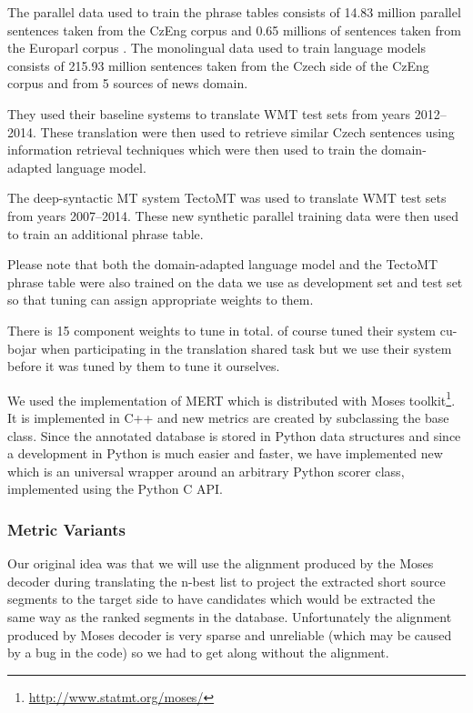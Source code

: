 The parallel data used to train the phrase tables consists of 14.83 million
parallel sentences taken from the CzEng corpus  and 0.65
millions of sentences taken from the Europarl corpus .
The monolingual data used to train language models consists of 215.93 million
sentences taken from the Czech side of the CzEng corpus and from 5 sources of
news domain. 

They used their baseline systems to translate WMT test sets from years
2012--2014.  These translation were then used to retrieve similar Czech
sentences using information retrieval techniques which were then used to train
the domain-adapted language model.

The deep-syntactic MT system TectoMT was used to translate WMT test sets from
years 2007--2014. These new synthetic parallel training data were then used to 
train an additional phrase table. 

Please note that both the domain-adapted language model and the TectoMT phrase
table were also trained on the data we use as development set and test set so
that tuning can assign appropriate weights to them.

There is 15 component weights to tune in total.  of
course tuned their system cu-bojar when participating in the translation shared
task but we use their system before it was tuned by them to tune it ourselves. 

We used the implementation of MERT which is distributed with Moses
toolkit\footnote{\url{http://www.statmt.org/moses/}}. It is implemented in C++
and new metrics are created by subclassing the base  class. Since
the annotated database is stored in Python data structures and since a
development in Python is much easier and faster, we have implemented new
 which is an universal wrapper around an arbitrary Python
scorer class, implemented using the Python C API.


\subsubsection{Metric Variants}

Our original idea was that we will use the alignment produced by the Moses
decoder during translating the n-best list to project the extracted short
source segments to the target side to have candidates which would be extracted
the same way as the ranked segments in the database. Unfortunately the
alignment produced by Moses decoder is very sparse and unreliable (which may be
caused by a bug in the code) so we had to get along without the alignment.

